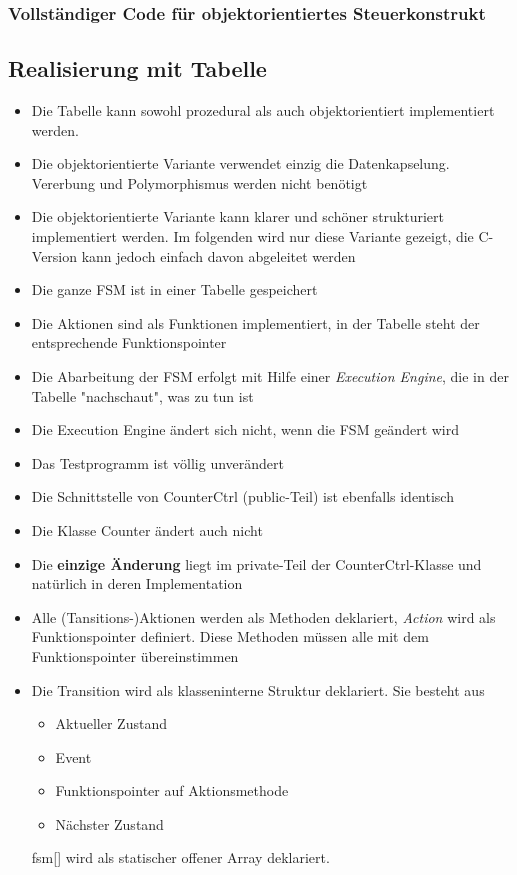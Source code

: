 \subsubsection{Vollständiger Code für objektorientiertes Steuerkonstrukt}



\subsection{Realisierung mit Tabelle}
\begin{itemize}
  \item Die Tabelle kann sowohl prozedural als auch objektorientiert implementiert werden.
  \item Die objektorientierte Variante verwendet einzig die Datenkapselung. Vererbung und Polymorphismus werden nicht benötigt
  \item Die objektorientierte Variante kann klarer und schöner strukturiert implementiert werden. Im folgenden wird nur diese Variante gezeigt, die C-Version kann jedoch einfach davon abgeleitet werden
  \item Die ganze FSM ist in einer Tabelle gespeichert
  \item Die Aktionen sind als Funktionen implementiert, in der Tabelle steht der entsprechende Funktionspointer
  \item Die Abarbeitung der FSM erfolgt mit Hilfe einer \textit{Execution Engine}, die in der Tabelle "nachschaut", was zu tun ist
  \item Die Execution Engine ändert sich nicht, wenn die FSM geändert wird
  \item Das Testprogramm ist völlig unverändert
  \item Die Schnittstelle von CounterCtrl (public-Teil) ist ebenfalls identisch
  \item Die Klasse Counter ändert auch nicht
  \item Die \textbf{einzige Änderung} liegt im private-Teil der
        CounterCtrl-Klasse und natürlich in deren Implementation
  \item Alle (Tansitions-)Aktionen werden als Methoden deklariert,
        \textit{Action} wird als Funktionspointer definiert. Diese Methoden müssen
        alle mit dem Funktionspointer übereinstimmen
        

  \item Die Transition wird als klasseninterne Struktur deklariert. Sie besteht
        aus
        \begin{itemize}
          \item Aktueller Zustand
          \item Event
          \item Funktionspointer auf Aktionsmethode
          \item Nächster Zustand
        \end{itemize}
        fsm[] wird als statischer offener Array deklariert.
        


\end{itemize}
